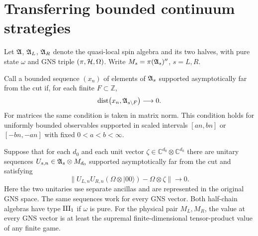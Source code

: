 \section{Transferring bounded continuum strategies}\label{app:scaling}
Let $\mathfrak A$, $\mathfrak A_L$, $\mathfrak A_R$ denote the quasi-local spin algebra and its two halves, with pure state $\omega$ and GNS triple $(\pi,\mathcal H,\Omega)$. Write $M_s=\pi(\mathfrak A_s)''$, $s=L,R$.

Call a bounded sequence $(x_n)$ of elements of $\mathfrak A_s$ supported asymptotically
far from the cut if, for each finite $F\subset\mathbb Z$,
\[
\operatorname{dist}\!\left(x_n,\mathfrak A_{s\setminus F}\right)\longrightarrow0.
\]
For matrices the same condition is taken in matrix norm. This condition holds
for uniformly bounded observables supported in scaled intervals $[an,bn]$ or
$[-bn,-an]$ with fixed $0<a<b<\infty$.

\begin{proposition}\label{prop:escape}
Suppose that for each $d_0$ and each unit vector
$\zeta\in\mathbb C^{d_0}\otimes\mathbb C^{d_0}$ there are unitary sequences
$U_{s,n}\in\mathfrak A_s\otimes M_{d_0}$ supported asymptotically far from the cut and
satisfying
\[
\big\|U_{L,n}U_{R,n}(\Omega\otimes|00\rangle)
       -\Omega\otimes\zeta\big\|\longrightarrow0.
\]
Here the two unitaries use separate ancillas and are represented in the
original GNS space. The same sequences work for every GNS vector. Both
half-chain algebras have type $\mathrm{III}_1$ if $\omega$ is pure. For the physical pair
$M_L,M_R$, the value at every GNS vector is at least the supremal
finite-dimensional tensor-product value of any finite game.
\end{proposition}

